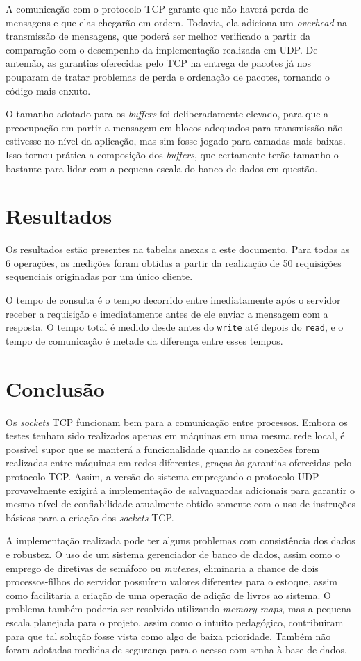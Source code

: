 \documentclass[11pt, brazil]{article} %
\begin{document}
A comunicação com o protocolo TCP garante que não haverá perda de mensagens e que elas chegarão em ordem. 
Todavia, ela adiciona um \emph{overhead} na transmissão de mensagens, que poderá ser melhor verificado a partir da comparação com o desempenho da implementação realizada em UDP. 
De antemão, as garantias oferecidas pelo TCP na entrega de pacotes já nos pouparam de tratar problemas de perda e ordenação de pacotes, tornando o código mais enxuto.

O tamanho adotado para os \emph{buffers} foi deliberadamente elevado, para que a preocupação em partir a mensagem em blocos adequados para transmissão não estivesse no nível da aplicação, mas sim fosse jogado para camadas mais baixas. Isso tornou prática a composição dos \emph{buffers}, que certamente terão tamanho o bastante para lidar com a pequena escala do banco de dados em questão.

\section{Resultados}

Os resultados estão presentes na tabelas anexas a este documento. Para todas as 6 operações,
as medições foram obtidas a partir da realização de 50 requisições sequenciais originadas
por um único cliente.

O tempo de consulta é o tempo decorrido entre imediatamente após o servidor receber a requisição e imediatamente antes de ele enviar a mensagem com a resposta. O tempo total é medido desde antes do \texttt{write} até depois do \texttt{read}, e o tempo de comunicação é metade da diferença entre esses tempos.

\section{Conclusão}

Os \emph{sockets} TCP funcionam bem para a comunicação entre processos. Embora os testes tenham sido realizados apenas em máquinas em uma mesma rede local, é possível supor que se manterá a funcionalidade quando as conexões forem realizadas entre máquinas em redes diferentes, graças às garantias oferecidas pelo protocolo TCP. 
Assim, a versão do sistema empregando o protocolo UDP provavelmente exigirá a implementação de salvaguardas adicionais para garantir o mesmo nível de confiabilidade atualmente obtido somente com o uso de instruções básicas para a criação dos \emph{sockets} TCP.

A implementação realizada pode ter alguns problemas com consistência dos dados e robustez. 
O uso de um sistema gerenciador de banco de dados, assim como o emprego de diretivas de semáforo ou \emph{mutexes}, eliminaria a chance de dois processos-filhos do servidor possuírem valores diferentes para o estoque, assim como facilitaria a criação de uma operação de adição de livros ao sistema. 
O problema também poderia ser resolvido utilizando \emph{memory maps}, mas a pequena escala planejada para o projeto, assim como o intuito pedagógico, contribuiram para que tal solução fosse vista como algo de baixa prioridade. 
Também não foram adotadas medidas de segurança para o acesso com senha à base de dados.
\end{document}
